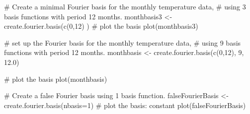 \documentclass{article}
\begin{document}
\begin{Examples}
\begin{ExampleCode}
# Create a minimal Fourier basis for the monthly temperature data, 
#  using 3 basis functions with period 12 months.
monthbasis3 <- create.fourier.basis(c(0,12) )
#  plot the basis
plot(monthbasis3)

# set up the Fourier basis for the monthly temperature data,
#  using 9 basis functions with period 12 months.
monthbasis <- create.fourier.basis(c(0,12), 9, 12.0)

#  plot the basis
plot(monthbasis)

# Create a false Fourier basis using 1 basis function.  
falseFourierBasis <- create.fourier.basis(nbasis=1)
#  plot the basis:  constant 
plot(falseFourierBasis)

\end{ExampleCode}
\end{Examples}
\end{document}
